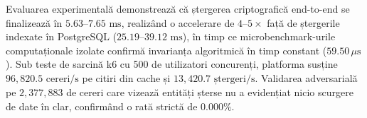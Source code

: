 Evaluarea experimentală demonstrează că ștergerea criptografică end-to-end se finalizează în $5.63\text{--}7.65\text{~ms}$, realizând o accelerare de $4\text{--}5\times$ față de ștergerile indexate în PostgreSQL ($25.19\text{--}39.12\text{~ms}$), în timp ce microbenchmark-urile computaționale izolate confirmă invarianța algoritmică în timp constant ($59.50\,\mu\text{s}$). Sub teste de sarcină k6 cu 500 de utilizatori concurenți, platforma susține $96{,}820.5\text{~cereri/s}$ pe citiri din cache și $13{,}420.7\text{~ștergeri/s}$. Validarea adversarială pe $2{,}377{,}883$ de cereri care vizează entități șterse nu a evidențiat nicio scurgere de date în clar, confirmând o rată strictă de $0.000\%$.

\vfill
